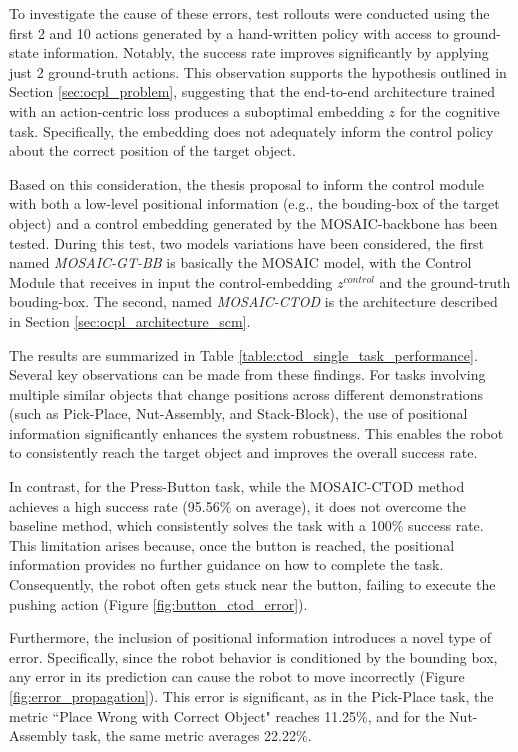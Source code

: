 To investigate the cause of these errors, test rollouts were conducted using the first 2 and 10 actions generated by a hand-written policy with access to ground-state information. Notably, the success rate improves significantly by applying just 2 ground-truth actions. This observation supports the hypothesis outlined in Section \ref{sec:ocpl_problem}, suggesting that the end-to-end architecture trained with an action-centric loss produces a suboptimal embedding $z$ for the cognitive task. Specifically, the embedding does not adequately inform the control policy about the correct position of the target object.

Based on this consideration, the thesis proposal to inform the control module with both a low-level positional information (e.g., the bouding-box of the target object) and a control embedding generated by the MOSAIC-backbone has been tested. During this test, two models variations have been considered, the first named \textit{MOSAIC-GT-BB} is basically the MOSAIC model, with the Control Module that receives in input the control-embedding $z^{control}$ and the ground-truth bouding-box. The second, named \textit{MOSAIC-CTOD} is the architecture described in Section \ref{sec:ocpl_architecture_scm}.


The results are summarized in Table \ref{table:ctod_single_task_performance}. Several key observations can be made from these findings. For tasks involving multiple similar objects that change positions across different demonstrations (such as Pick-Place, Nut-Assembly, and Stack-Block), the use of positional information significantly enhances the system robustness. This enables the robot to consistently reach the target object and improves the overall success rate.

In contrast, for the Press-Button task, while the MOSAIC-CTOD method achieves a high success rate (95.56\% on average), it does not overcome the baseline method, which consistently solves the task with a 100\% success rate. This limitation arises because, once the button is reached, the positional information provides no further guidance on how to complete the task. Consequently, the robot often gets stuck near the button, failing to execute the pushing action (Figure \ref{fig:button_ctod_error}).


Furthermore, the inclusion of positional information introduces a novel type of error. Specifically, since the robot behavior is conditioned by the bounding box, any error in its prediction can cause the robot to move incorrectly (Figure \ref{fig:error_propagation}). This error is significant, as in the Pick-Place task, the metric ``Place Wrong with Correct Object" reaches 11.25\%, and for the Nut-Assembly task, the same metric averages 22.22\%.


